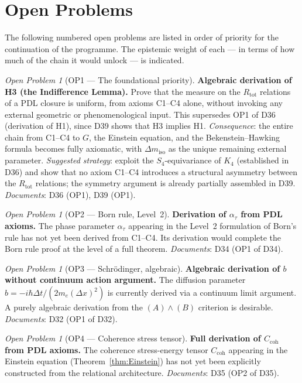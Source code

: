 \documentclass[11pt,a4paper]{article}
\theoremstyle{plain}
\theoremstyle{definition}
\theoremstyle{remark}
\newtheorem{openproblem}[theorem]{Open Problem}
\newcommand{\Kfour}{K_4}
\newcommand{\Rtot}{R_{\mathrm{tot}}}
\begin{document}
\section{Open Problems}
\label{sec:open_problems}

The following numbered open problems are listed in order of priority for the continuation of the programme.
The epistemic weight of each — in terms of how much of the chain it would unlock — is indicated.

\begin{openproblem}[OP1 — The foundational priority]
\label{op:H3}
\textbf{Algebraic derivation of H3 (the Indifference Lemma).}
Prove that the measure on the $\Rtot$ relations of a PDL closure is uniform, from axioms C1--C4 alone, without invoking any external geometric or phenomenological input.
This supersedes OP1 of D36 (derivation of H1), since D39 shows that H3 implies H1.
\emph{Consequence}: the entire chain from C1--C4 to $G$, the Einstein equation, and the Bekenstein--Hawking formula becomes fully axiomatic, with $\Delta m_{\mathrm{iso}}$ as the unique remaining external parameter.
\emph{Suggested strategy}: exploit the $S_4$-equivariance of $\Kfour$ (established in D36) and show that no axiom C1--C4 introduces a structural asymmetry between the $\Rtot$ relations; the symmetry argument is already partially assembled in D39.
\emph{Documents}: D36 (OP1), D39 (OP1).
\end{openproblem}

\begin{openproblem}[OP2 — Born rule, Level~2]
\label{op:born_level2}
\textbf{Derivation of $\alpha_\tau$ from PDL axioms.}
The phase parameter $\alpha_\tau$ appearing in the Level~2 formulation of Born's rule has not yet been derived from C1--C4.
Its derivation would complete the Born rule proof at the level of a full theorem.
\emph{Documents}: D34 (OP1 of D34).
\end{openproblem}

\begin{openproblem}[OP3 — Schr\"odinger, algebraic]
\label{op:schrodinger_b}
\textbf{Algebraic derivation of $b$ without continuum action argument.}
The diffusion parameter $b=-i\hbar\Delta t/(2m_e(\Delta x)^2)$ is currently derived via a continuum limit argument.
A purely algebraic derivation from the $(A)\wedge(B)$ criterion is desirable.
\emph{Documents}: D32 (OP1 of D32).
\end{openproblem}

\begin{openproblem}[OP4 — Coherence stress tensor]
\label{op:Ccoh}
\textbf{Full derivation of $C_{\mathrm{coh}}$ from PDL axioms.}
The coherence stress-energy tensor $C_{\mathrm{coh}}$ appearing in the Einstein equation (Theorem~\ref{thm:Einstein}) has not yet been explicitly constructed from the relational architecture.
\emph{Documents}: D35 (OP2 of D35).
\end{openproblem}
\end{document}
